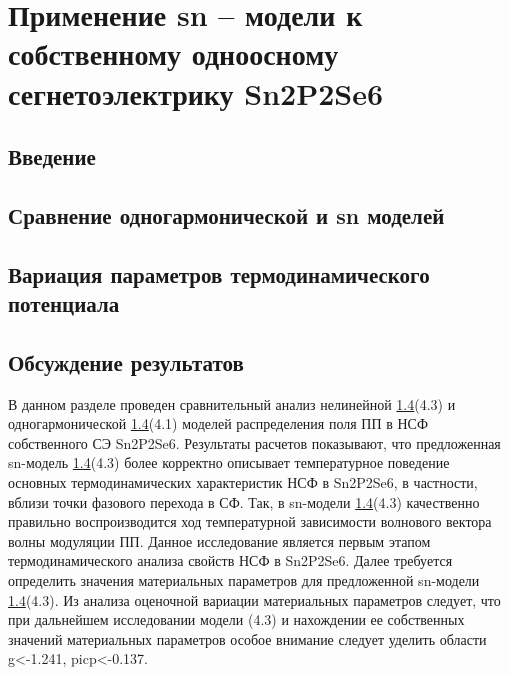 
\chapter{Применение sn – модели к собственному одноосному сегнетоэлектрику Sn2P2Se6}

\section{Введение}

\section{Сравнение одногармонической и sn моделей}

\section{Вариация параметров термодинамического потенциала}

\section{Обсуждение результатов}

В данном разделе проведен сравнительный анализ нелинейной \ref{}(4.3) и одногармонической \ref{}(4.1) моделей распределения поля ПП в НСФ собственного СЭ Sn2P2Se6. Результаты расчетов показывают, что предложенная sn-модель \ref{}(4.3) более корректно описывает температурное поведение основных термодинамических характеристик НСФ в Sn2P2Se6, в частности, вблизи точки фазового перехода в СФ. Так, в sn-модели \ref{}(4.3) качественно правильно воспроизводится ход температурной зависимости волнового вектора волны модуляции ПП.
Данное исследование является первым этапом термодинамического анализа свойств НСФ в Sn2P2Se6. Далее требуется определить значения материальных параметров для предложенной sn-модели \ref{}(4.3). Из анализа оценочной вариации материальных параметров следует, что при дальнейшем исследовании модели (4.3) и нахождении ее собственных значений материальных параметров особое внимание следует уделить области g<-1.241, picp<-0.137.